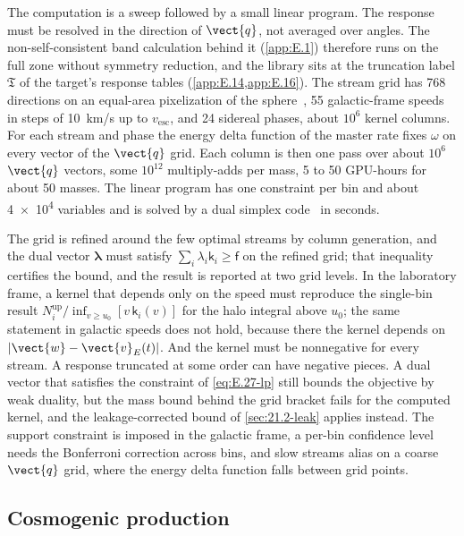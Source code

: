 The computation is a sweep followed by a small linear program. The response must be resolved in the direction of $\vect{q}$, not averaged over angles. The non-self-consistent band calculation behind it (\cref{app:E.1}) therefore runs on the full zone without symmetry reduction, and the library sits at the truncation label $\mathfrak{T}$ of the target's response tables (\cref{app:E.14,app:E.16}). The stream grid has 768 directions on an equal-area pixelization of the sphere~\cite{gorski2005healpix}, 55 galactic-frame speeds in steps of \SI{10}{km/s} up to $v_{\mathrm{esc}}$, and 24 sidereal phases, about $10^6$ kernel columns. For each stream and phase the energy delta function of the master rate fixes $\omega$ on every vector of the $\vect{q}$ grid. Each column is then one pass over about $10^6$ $\vect{q}$ vectors, some $10^{12}$ multiply-adds per mass, 5 to 50 GPU-hours for about 50 masses. The linear program has one constraint per bin and about \num{4e4} variables and is solved by a dual simplex code~\cite{huangfu2018parallelizing} in seconds.

The grid is refined around the few optimal streams by column generation, and the dual vector $\boldsymbol{\lambda}$ must satisfy $\sum_i\lambda_i\mathsf{k}_i \ge \mathsf{f}$ on the refined grid; that inequality certifies the bound, and the result is reported at two grid levels. In the laboratory frame, a kernel that depends only on the speed must reproduce the single-bin result $N_i^{\mathrm{up}}/\inf_{v \ge u_0}[v\,\mathsf{k}_i(v)]$ for the halo integral above $u_0$; the same statement in galactic speeds does not hold, because there the kernel depends on $|\vect{w} - \vect{v}_E(t)|$. And the kernel must be nonnegative for every stream. A response truncated at some order can have negative pieces. A dual vector that satisfies the constraint of \cref{eq:E.27-lp} still bounds the objective by weak duality, but the mass bound behind the grid bracket fails for the computed kernel, and the leakage-corrected bound of \cref{sec:21.2-leak} applies instead. The support constraint is imposed in the galactic frame, a per-bin confidence level needs the Bonferroni correction across bins, and slow streams alias on a coarse $\vect{q}$ grid, where the energy delta function falls between grid points.

\subsection{Cosmogenic production}

